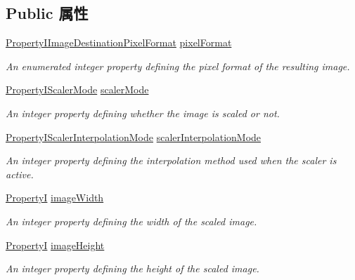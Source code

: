 \subsection*{Public 属性}
\begin{DoxyCompactItemize}
\item 
\hyperlink{group___common_interface_ga4b749ac6f5a0ae8744177180cfa1c955}{Property\+I\+Image\+Destination\+Pixel\+Format} \hyperlink{classmv_i_m_p_a_c_t_1_1acquire_1_1_image_destination_abfd0d30346d66251d5941a5e57efb784}{pixel\+Format}
\begin{DoxyCompactList}\small\item\em An enumerated integer property defining the pixel format of the resulting image. \end{DoxyCompactList}\item 
\hyperlink{group___common_interface_ga0adb8ca6f3c1ff4cc9813bcee143580f}{Property\+I\+Scaler\+Mode} \hyperlink{classmv_i_m_p_a_c_t_1_1acquire_1_1_image_destination_a0e85ee4b320d7b84f664d00d02965c73}{scaler\+Mode}
\begin{DoxyCompactList}\small\item\em An integer property defining whether the image is scaled or not. \end{DoxyCompactList}\item 
\hyperlink{group___common_interface_ga935c38ccadc072128888280fa7a78e0e}{Property\+I\+Scaler\+Interpolation\+Mode} \hyperlink{classmv_i_m_p_a_c_t_1_1acquire_1_1_image_destination_afea899675c351778785fe0e0d4f4d29c}{scaler\+Interpolation\+Mode}
\begin{DoxyCompactList}\small\item\em An integer property defining the interpolation method used when the scaler is active. \end{DoxyCompactList}\item 
\hyperlink{group___common_interface_ga12d5e434238ca242a1ba4c6c3ea45780}{Property\+I} \hyperlink{classmv_i_m_p_a_c_t_1_1acquire_1_1_image_destination_a4bbc153c68625e5e4a662d2334044df2}{image\+Width}
\begin{DoxyCompactList}\small\item\em An integer property defining the width of the scaled image. \end{DoxyCompactList}\item 
\hyperlink{group___common_interface_ga12d5e434238ca242a1ba4c6c3ea45780}{Property\+I} \hyperlink{classmv_i_m_p_a_c_t_1_1acquire_1_1_image_destination_a44d0d15b998bbc624d809e604cc1ae65}{image\+Height}
\begin{DoxyCompactList}\small\item\em An integer property defining the height of the scaled image. \end{DoxyCompactList}\end{DoxyCompactItemize}
